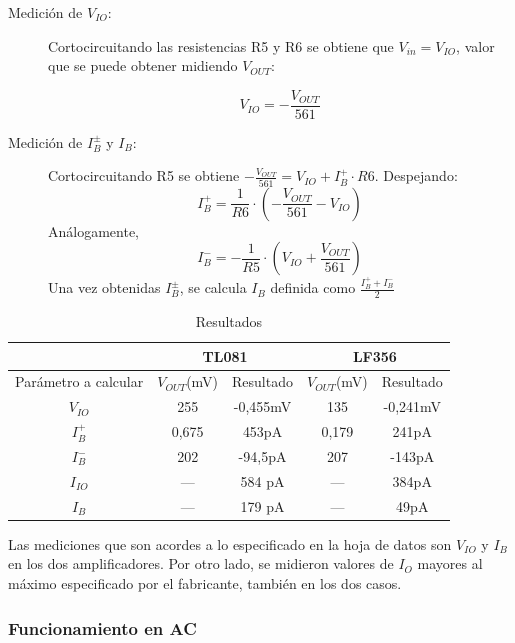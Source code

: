 \documentclass[../../main.tex]{subfiles}
\begin{document}
\begin{description}
	\item[Medici\'on de $V_{IO}$:] Cortocircuitando las resistencias R5 y R6 se obtiene que $V_{in} = V_{IO}$, valor que se puede obtener midiendo $V_{OUT}$:
	
	\[V_{IO} = -\frac{V_{OUT}}{561}\]
	\item[Medici\'on de $I_B^\pm$ y $I_B$:] Cortocircuitando R5 se obtiene $-\frac{V_{OUT}}{561} = V_{IO} + I_B^+\cdot R6$. Despejando:
	\[I_B^+=\frac{1}{R6}\cdot\left( -\frac{V_{OUT}}{561}-V_{IO}  \right) \]
	An\'alogamente,
	\[I_B^-=-\frac{1}{R5}\cdot \left( V_{IO} + \frac{V_{OUT}}{561}   \right)\]
	Una vez obtenidas $I_B^\pm$, se calcula $I_B$ definida como $\frac{I_B^++I_B^-}{2}$
\end{description}

\begin{table}[htbp]
\centering
\begin{tabular}{ccccc}
                       & \multicolumn{2}{c}{TL081} & \multicolumn{2}{c}{LF356} \\
\hline
Par\'ametro a calcular & $V_{OUT}$(mV)& Resultado  & $V_{OUT}$(mV)& Resultado  \\
\hline
$V_{IO}$               & 255          & -0,455mV   & 135          & -0,241mV   \\
$I_B^+$                & 0,675        & 453pA      & 0,179        & 241pA      \\
$I_B^-$                & 202          & -94,5pA    & 207          & -143pA     \\
$I_{IO}$			   &     ---      & 584 pA	   &	  ---     & 384pA      \\
$I_B$				   &     ---      & 179 pA     &      ---     & 49pA
\end{tabular}%

\caption{Resultados}
\label{tab:ej_3_resultados}
\end{table}

Las mediciones que son acordes a lo especificado en la hoja de datos son $V_{IO}$  y $I_B$ en los dos amplificadores. Por otro lado, se midieron valores de $I_O$ mayores al m\'aximo especificado por el fabricante, tambi\'en en los dos casos.



\subsubsection{Funcionamiento en AC}
\end{document}
